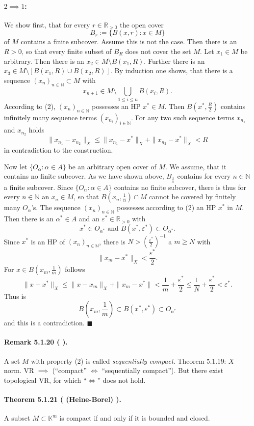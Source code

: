\documentclass[12pt]{article}
\newcommand{\N}{\mathbb{N}}
\newcommand{\R}{\mathbb{R}}
\newcommand{\K}{\mathbb{K}} %
\newcommand{\eps}{\varepsilon}
\newcommand{\NumberedTheorem}[3]{%
\paragraph*{Theorem #1 ( #2 ).} #3\par}
\newcommand{\NumberedRemark}[3]{%
\paragraph*{Remark #1 ( #2 ).} #3\par}
\begin{document}
\paragraph*{$2 \implies 1$:}
We show first, that for every $r \in \R_{>0}$ the open cover
\[
B_r := \{B(x, r) : x \in M\}
\]
of $M$ contains a finite subcover.
Assume this is not the case. Then there is an $R > 0$, so that every finite subset of $B_R$ does not cover the set $M$. Let $x_1 \in M$ be arbitrary. Then there is an $x_2 \in M \setminus B(x_1, R)$. Further there is an $x_3 \in M \setminus [B(x_1, R) \cup B(x_2, R)]$. By induction one shows, that there is a sequence $(x_n)_{n \in \N} \subset M$ with
\[
x_{n+1} \in M \setminus \bigcup_{1 \le i \le n} B(x_i, R).
\]
According to (2), $(x_n)_{n \in \N}$ possesses an HP $x^* \in M$. Then $B(x^*, \frac{R}{2})$ contains infinitely many sequence terms $(x_{n_i})_{i \in \N}$. For any two such sequence terms $x_{n_1}$ and $x_{n_2}$ holds
\[
\|x_{n_1} - x_{n_2}\|_X \le \|x_{n_1} - x^*\|_X + \|x_{n_2} - x^*\|_X < R
\]
in contradiction to the construction.

Now let $\{O_\alpha : \alpha \in A\}$ be an arbitrary open cover of $M$. We assume, that it contains no finite subcover. As we have shown above, $B_{\frac{1}{n}}$ contains for every $n \in \N$ a finite subcover. Since $\{O_\alpha : \alpha \in A\}$ contains no finite subcover, there is thus for every $n \in \N$ an $x_n \in M$, so that $B(x_n, \frac{1}{n}) \cap M$ cannot be covered by finitely many $O_\alpha$'s. The sequence $(x_n)_{n \in \N}$ possesses according to (2) an HP $x^*$ in $M$. Then there is an $\alpha^* \in A$ and an $\eps^* \in \R_{>0}$ with
\[
x^* \in O_{\alpha^*} \text{ and } B(x^*, \eps^*) \subset O_{\alpha^*}.
\]
Since $x^*$ is an HP of $(x_n)_{n \in \N}$, there is $N > (\frac{\eps^*}{2})^{-1}$ a $m \ge N$ with
\[
\|x_m - x^*\|_X < \frac{\eps^*}{2}.
\]
For $x \in B(x_m, \frac{1}{m})$ follows
\[
\|x - x^*\|_X \le \|x - x_m\|_X + \|x_m - x^*\| < \frac{1}{m} + \frac{\eps^*}{2} \le \frac{1}{N} + \frac{\eps^*}{2} < \eps^*.
\]
Thus is
\[
B\left(x_m, \frac{1}{m}\right) \subset B(x^*, \eps^*) \subset O_{\alpha^*}
\]
and this is a contradiction. \hfill $\blacksquare$

\NumberedRemark{5.1.20}{}{A set $M$ with property (2) is called \textit{sequentially compact}. Theorem 5.1.19: $X$ norm. VR $\implies$ (``compact'' $\iff$ ``sequentially compact''). But there exist topological VR, for which ``$\iff$'' does not hold.}

\NumberedTheorem{5.1.21}{(Heine-Borel)}{A subset $M \subset \K^m$ is compact if and only if it is bounded and closed.}
\end{document}
